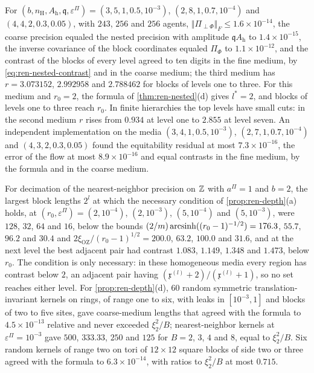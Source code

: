 \begin{numcheck}\label{chk:ren-nested}
For $(b,n_{\mathrm H},A_{\mathrm h},\mathfrak q,\varepsilon^\Pi)=(3,5,1,0.5,10^{-3})$, $(2,8,1,0.7,10^{-4})$ and $(4,4,2,0.3,0.05)$, with $243$, $256$ and $256$ agents, $\Vert\Pi_{\perp\Phi}\Vert_F\le1.6\times10^{-14}$, the coarse precision equaled the nested precision with amplitude $\mathfrak qA_{\mathrm h}$ to $1.4\times10^{-15}$, the inverse covariance of the block coordinates equaled $\Pi_\Phi$ to $1.1\times10^{-12}$, and the contrast of the blocks of every level agreed to ten digits in the fine medium, by \eqref{eq:ren-nested-contrast} and in the coarse medium; the third medium has $r=3.073152$, $2.992958$ and $2.788462$ for blocks of levels one to three. For this medium and $r_0=2$, the formula of \cref{thm:ren-nested}(d) gives $l^\ast=2$, and blocks of levels one to three reach $r_0$. In finite hierarchies the top levels have small cuts: in the second medium $r$ rises from $0.934$ at level one to $2.855$ at level seven. An independent implementation on the media $(3,4,1,0.5,10^{-3})$, $(2,7,1,0.7,10^{-4})$ and $(4,3,2,0.3,0.05)$ found the equitability residual at most $7.3\times10^{-16}$, the error of the flow at most $8.9\times10^{-16}$ and equal contrasts in the fine medium, by the formula and in the coarse medium.
\end{numcheck}

\begin{numcheck}[Depth]\label{chk:ren-depth}
For decimation of the nearest-neighbor precision on $\mathbb{Z}$ with $a^\Pi=1$ and $b=2$, the largest block lengths $2^l$ at which the necessary condition of \cref{prop:ren-depth}(a) holds, at $(r_0,\varepsilon^\Pi)=(2,10^{-4})$, $(2,10^{-3})$, $(5,10^{-4})$ and $(5,10^{-3})$, were $128$, $32$, $64$ and $16$, below the bounds $(2/m)\operatorname{arcsinh}((r_0-1)^{-1/2})=176.3$, $55.7$, $96.2$ and $30.4$ and $2\xi_{\mathrm{OZ}}/(r_0-1)^{1/2}=200.0$, $63.2$, $100.0$ and $31.6$, and at the next level the best adjacent pair had contrast $1.083$, $1.149$, $1.348$ and $1.473$, below $r_0$. The condition is only necessary: in these homogeneous media every region has contrast below $2$, an adjacent pair having $(\mathfrak x^{(l)}+2)/(\mathfrak x^{(l)}+1)$, so no set reaches either level. For \cref{prop:ren-depth}(d), $60$ random symmetric translation-invariant kernels on rings, of range one to six, with leaks in $[10^{-3},1]$ and blocks of two to five sites, gave coarse-medium lengths that agreed with the formula to $4.5\times10^{-13}$ relative and never exceeded $\xi_2^2/B$; nearest-neighbor kernels at $\varepsilon^\Pi=10^{-3}$ gave $500$, $333.33$, $250$ and $125$ for $B=2$, $3$, $4$ and $8$, equal to $\xi_2^2/B$. Six random kernels of range two on tori of $12\times12$ square blocks of side two or three agreed with the formula to $6.3\times10^{-14}$, with ratios to $\xi_2^2/B$ at most $0.715$.
\end{numcheck}

